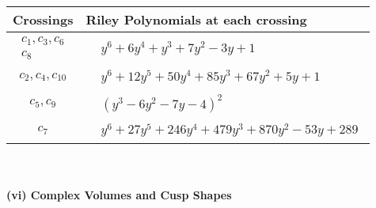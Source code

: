 \documentclass[1p]{elsarticle_modified}
\theoremstyle{definition}
\begin{document}
\begin{tabular}{m{50pt}|m{274pt}}
Crossings & \hspace{64pt}Riley Polynomials at each crossing \\
\hline $$\begin{aligned}c_{1},c_{3},c_{6}\\c_{8}\end{aligned}$$&$\begin{aligned}
&y^6+6 y^4+y^3+7 y^2-3 y+1
\end{aligned}$\\
\hline $$\begin{aligned}c_{2},c_{4},c_{10}\end{aligned}$$&$\begin{aligned}
&y^6+12 y^5+50 y^4+85 y^3+67 y^2+5 y+1
\end{aligned}$\\
\hline $$\begin{aligned}c_{5},c_{9}\end{aligned}$$&$\begin{aligned}
&(y^3-6 y^2-7 y-4)^2
\end{aligned}$\\
\hline $$\begin{aligned}c_{7}\end{aligned}$$&$\begin{aligned}
&y^6+27 y^5+246 y^4+479 y^3+870 y^2-53 y+289
\end{aligned}$\\
\hline
\end{tabular}\\~\\
\newpage\flushleft \textbf{(vi) Complex Volumes and Cusp Shapes}
\end{document}
